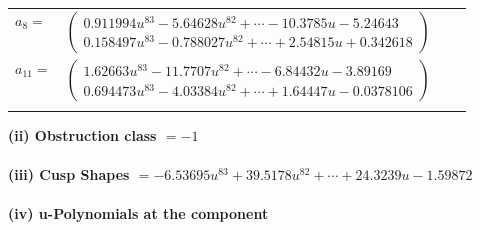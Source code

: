 \documentclass[1p]{elsarticle_modified}
\theoremstyle{definition}
\begin{document}
\begin{tabular}{m{7pt} m{180pt} m{7pt} m{180pt} }
\flushright $a_{8}=$&$\begin{pmatrix}0.911994 u^{83}-5.64628 u^{82}+\cdots-10.3785 u-5.24643\\0.158497 u^{83}-0.788027 u^{82}+\cdots+2.54815 u+0.342618\end{pmatrix}$ \\
\flushright $a_{11}=$&$\begin{pmatrix}1.62663 u^{83}-11.7707 u^{82}+\cdots-6.84432 u-3.89169\\0.694473 u^{83}-4.03384 u^{82}+\cdots+1.64447 u-0.0378106\end{pmatrix}$\\&\end{tabular}
\flushleft \textbf{(ii) Obstruction class $= -1$}\\~\\
\flushleft \textbf{(iii) Cusp Shapes $= -6.53695 u^{83}+39.5178 u^{82}+\cdots+24.3239 u-1.59872$}\\~\\
\newpage\renewcommand{\arraystretch}{1}
\flushleft \textbf{(iv) u-Polynomials at the component}\newline \\
\end{document}
